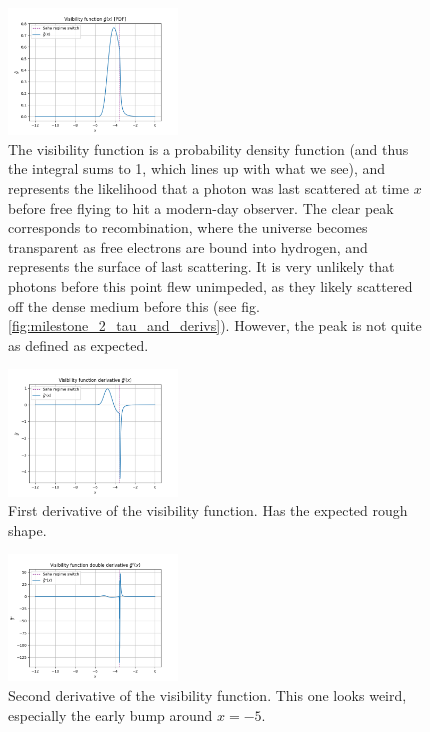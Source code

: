 \begin{figure}[h!tbp]
\centering
\includegraphics[width=0.4\textwidth]{../Milestone 2/Plots/g_tilde.png}
\caption{The visibility function is a probability density function (and thus the integral sums to 1, which lines up with what we see), and represents the likelihood that a photon was last scattered at time $x$ before free flying to hit a modern-day observer. The clear peak corresponds to recombination, where the universe becomes transparent as free electrons are bound into hydrogen, and represents the surface of last scattering. It is very unlikely that photons before this point flew unimpeded, as they likely scattered off the dense medium before this (see fig. \ref{fig:milestone_2_tau_and_derivs}). However, the peak is not quite as defined as expected.}
\label{fig:milestone_2_g_tilde}
\end{figure}

\begin{figure}[h!tbp]
\centering
\includegraphics[width=0.4\textwidth]{../Milestone 2/Plots/g_tilde_deriv.png}
\caption{First derivative of the visibility function. Has the expected rough shape.}
\label{fig:milestone_2_g_tilde_deriv}
\end{figure}

\begin{figure}[h!tbp]
\centering
\includegraphics[width=0.4\textwidth]{../Milestone 2/Plots/g_tilde_double_deriv.png}
\caption{Second derivative of the visibility function. This one looks weird, especially the early bump around $x=-5$.}
\label{fig:milestone_2_g_tilde_double_deriv}
\end{figure}
